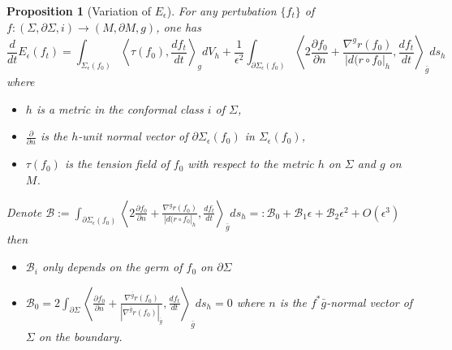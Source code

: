 \documentclass[11pt]{article}
\newtheorem{proposition}{Proposition}[theorem]
\begin{document}
\begin{proposition}[Variation of \( E_\epsilon \)]
\label{prop:var-Eeps}
For any pertubation \(\{f_t\}\) of \(f: (\Sigma,\partial\Sigma,i) \longrightarrow (M,\partial M,g)\), one has
\begin{equation}
\label{eq:var-Eeps}
\frac{d}{dt}E_\epsilon(f_t) = \int_{\Sigma_\epsilon(f_0)} \left\langle \tau(f_0), \frac{df_t}{dt} \right\rangle_g dV_h + \frac{1}{\epsilon^2}\int_{\partial\Sigma_\epsilon(f_0)}\left \langle 2 \frac{\partial f_0}{\partial n} + \frac{\nabla^g r(f_0)}{|d(r\circ f_0|_h}  , \frac{df_t}{dt}\right \rangle_{\bar g} ds_h  
\end{equation}
where 
\begin{itemize}
\item \(h\) is a metric in the conformal class \(i\) of \(\Sigma\),
\item \(\frac{\partial}{\partial n}\) is the \(h\)-unit normal vector of \(\partial\Sigma_\epsilon(f_0)\) in \(\Sigma_\epsilon(f_0)\),
\item \(\tau(f_0)\) is the tension field of \(f_0\) with respect to the metric \(h\)
on \(\Sigma\) and \(g\) on \(M\).
\end{itemize}
Denote \(\mathcal{B} := \int_{\partial\Sigma_\epsilon(f_0)}\left
  \langle 2 \frac{\partial f_0}{\partial n} + \frac{\nabla^g r(f_0)}{|d(r\circ f_0|_h}  ,
  \frac{df_t}{dt}\right \rangle_{\bar g} ds_h =: \mathcal{B}_0 + \mathcal{B}_1 \epsilon +
  \mathcal{B}_2 \epsilon^2 + O(\epsilon^3)\) then 
\begin{itemize}
\item \(\mathcal{B}_i\) only depends on the germ of \(f_0\) on \(\partial\Sigma\)
\item \(\mathcal{B}_0 = 2\int_{\partial\Sigma}\left \langle \frac{\partial f_0}{\partial n} +
     \frac{\nabla^{\bar g}r(f_0)}{|\nabla^{\bar g}r(f_0)|_{\bar g}}, \frac{df_t}{dt}\right
     \rangle_{\bar g} ds_h = 0\) where \(n\) is the \(f^* \bar g\)-normal vector of \(\Sigma\) on
the boundary.
\end{itemize}
\end{proposition}
\end{document}
